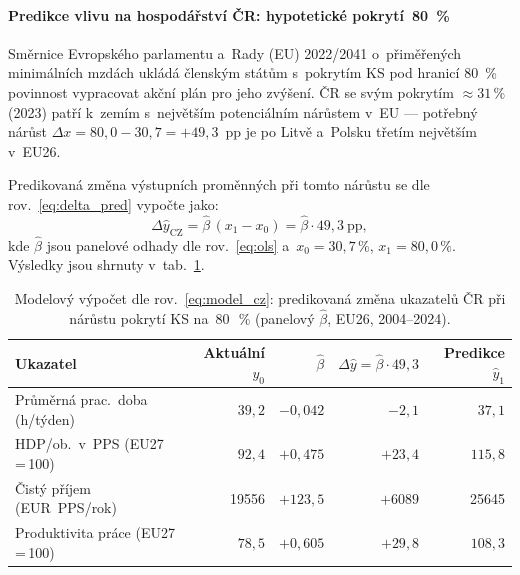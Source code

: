 \paragraph{Predikce vlivu na hospodářství ČR: hypotetické pokrytí~80~\%}\label{par:predikce}

Směrnice Evropského parlamentu a~Rady (EU) 2022/2041 o~přiměřených minimálních mzdách ukládá členským státům s~pokrytím \ac{KS} pod hranicí 80~\% povinnost vypracovat akční plán pro jeho zvýšení.
ČR se svým pokrytím $\approx 31\,\%$ (2023) patří k~zemím s~největším potenciálním nárůstem v~EU --- potřebný nárůst $\Delta x = 80{,}0 - 30{,}7 = +49{,}3$~pp je po Litvě a~Polsku třetím největším v~EU26.

Predikovaná změna výstupních proměnných při tomto nárůstu se dle rov.~\eqref{eq:delta_pred} vypočte jako:
\begin{equation}\label{eq:model_cz}
  \Delta\hat{y}_{\text{CZ}}
    = \hat{\beta}\,(x_1 - x_0)
    = \hat{\beta} \cdot 49{,}3\ \text{pp},
\end{equation}
kde $\hat{\beta}$ jsou panelové odhady dle rov.~\eqref{eq:ols} a~$x_0 = 30{,}7\,\%$, $x_1 = 80{,}0\,\%$.
Výsledky jsou shrnuty v~tab.~\ref{tab:model_cz}.

\begin{table}[htbp]
\centering
\caption{Modelový výpočet dle rov.~\eqref{eq:model_cz}: predikovaná změna ukazatelů ČR
         při nárůstu pokrytí \ac{KS} na~80~\,\% (panelový $\hat{\beta}$, EU26, 2004--2024).}
\label{tab:model_cz}
\begin{tabular}{lrrrr}
\toprule
Ukazatel
  & Aktuální $y_0$
  & $\hat{\beta}$
  & $\Delta\hat{y} = \hat{\beta}\cdot 49{,}3$
  & Predikce $\hat{y}_1$ \\
\midrule
Průměrná prac.~doba (h/týden)    & $39{,}2$ & $-0{,}042$ & $-2{,}1$  & $37{,}1$ \\
HDP/ob.~v~PPS (EU27\,=\,100)     & $92{,}4$ & $+0{,}475$ & $+23{,}4$ & $115{,}8$ \\
Čistý příjem (EUR~PPS/rok) & \num{19556} & $+123{,}5$ & $+\num{6089}$ & \num{25645} \\
Produktivita práce (EU27\,=\,100)  & $78{,}5$ & $+0{,}605$ & $+29{,}8$ & $108{,}3$ \\
\bottomrule
\end{tabular}
\end{table}

